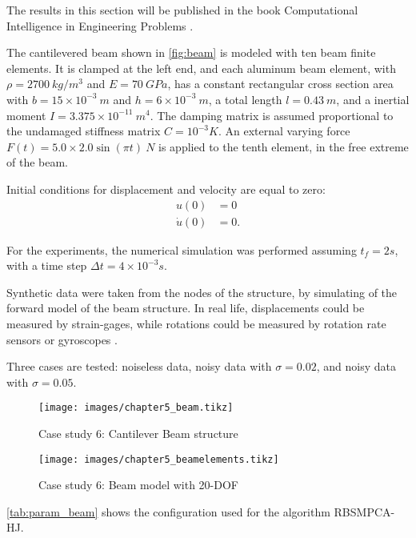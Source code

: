 The results in this section will be published in the book Computational Intelligence in Engineering Problems \cite{hernandez2017a}.

The cantilevered beam shown in \autoref{fig:beam} is modeled with ten beam finite elements. It is clamped at the left end, and each aluminum beam element, with $\rho = 2700~kg/m^3$ and $E = 70~GPa$, has a constant rectangular cross section area with $b = 15 \times 10^{-3}~m$ and $h = 6 \times 10^{-3}~m$, a total length $l = 0.43~m$, and a inertial moment $I = 3.375 \times 10^{-11}~m^4$. The damping matrix is assumed proportional to the undamaged stiffness matrix $C = 10^{-3}K$. An external varying force $F(t) = 5.0 \times 2.0 \sin(\pi t)~N$ is applied to the tenth element, in the free extreme of the beam.
    
Initial conditions for displacement and velocity are equal to zero: 
%
\begin{align}
    u(0) &= 0 \\
    \dot u(0) &= 0.
\end{align}

For the experiments, the numerical simulation was performed assuming $t_f = 2s$, with a time step $\Delta t = 4\times 10^{-3}s$.

Synthetic data were taken from the nodes of the structure, by simulating of the forward model of the beam structure. In real life, displacements could be measured by strain-gages, while rotations could be measured by rotation rate sensors or gyroscopes \cite{Zembaty2016}.

Three cases are tested: noiseless data, noisy data with $\sigma = 0.02$, and noisy data with $\sigma = 0.05$.

\begin{figure}[H]
\caption{Case study 6: Cantilever Beam structure}
\label{fig:beam}
\centering
\texttt{[image: images/chapter5\_beam.tikz]}
\end{figure}

\begin{figure}[H]
\caption{Case study 6: Beam model with 20-DOF}
\label{fig:beam20}
\centering
\texttt{[image: images/chapter5\_beamelements.tikz]}
\end{figure}

\autoref{tab:param_beam} shows the configuration used for the algorithm RBSMPCA-HJ.

